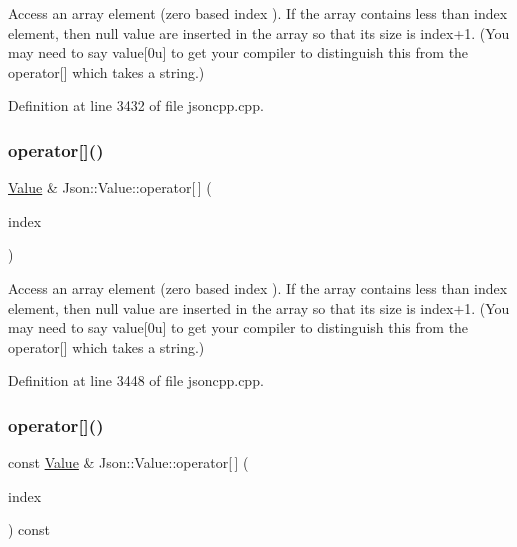 Access an array element (zero based index ). If the array contains less than index element, then null value are inserted in the array so that its size is index+1. (You may need to say \textquotesingle{}value\mbox{[}0u\mbox{]}\textquotesingle{} to get your compiler to distinguish this from the operator\mbox{[}\mbox{]} which takes a string.) 

Definition at line 3432 of file jsoncpp.\+cpp.

\hypertarget{class_json_1_1_value_ac9182982c361e0ab621134d406e5f250}{}\label{class_json_1_1_value_ac9182982c361e0ab621134d406e5f250} 
\subsubsection{\texorpdfstring{operator[]()}{operator[]()}\hspace{0.1cm}{\footnotesize\ttfamily [11/18]}}
{\footnotesize\ttfamily \hyperlink{class_json_1_1_value}{Value} \& Json\+::\+Value\+::operator\mbox{[}$\,$\mbox{]} (\begin{DoxyParamCaption}\item[{int}]{index }\end{DoxyParamCaption})}

Access an array element (zero based index ). If the array contains less than index element, then null value are inserted in the array so that its size is index+1. (You may need to say \textquotesingle{}value\mbox{[}0u\mbox{]}\textquotesingle{} to get your compiler to distinguish this from the operator\mbox{[}\mbox{]} which takes a string.) 

Definition at line 3448 of file jsoncpp.\+cpp.

\hypertarget{class_json_1_1_value_a46607236038b29695ed80c15895271e4}{}\label{class_json_1_1_value_a46607236038b29695ed80c15895271e4} 
\subsubsection{\texorpdfstring{operator[]()}{operator[]()}\hspace{0.1cm}{\footnotesize\ttfamily [12/18]}}
{\footnotesize\ttfamily const \hyperlink{class_json_1_1_value}{Value} \& Json\+::\+Value\+::operator\mbox{[}$\,$\mbox{]} (\begin{DoxyParamCaption}\item[{\hyperlink{class_json_1_1_value_a184a91566cccca7b819240f0d5561c7d}{Array\+Index}}]{index }\end{DoxyParamCaption}) const}

